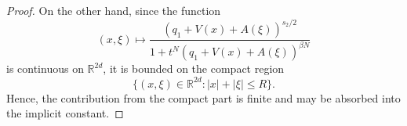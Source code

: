 \documentclass[12pt,reqno,a4paper]{amsart}
\numberwithin{equation}{section}
\theoremstyle{plain}
\theoremstyle{definition}
\theoremstyle{remark}
\begin{document}
\begin{proof}
On the other hand, since the function
\[
(x,\xi)
\mapsto
\frac{(q_{1}+V(x)+A(\xi))^{s_{2}/2}}
{1+t^{N}(q_{1}+V(x)+A(\xi))^{\beta N}}
\]
is continuous on $\mathbb{R}^{2d}$, it is bounded on the compact region
\[
\{(x,\xi)\in\mathbb{R}^{2d}: |x|+|\xi|\leq R\}.
\]
Hence, the contribution from the compact part is finite and may be absorbed into the implicit constant.








\end{proof}
\end{document}
